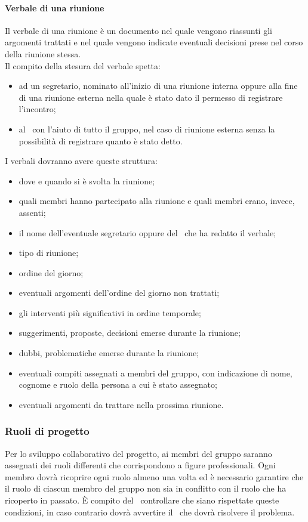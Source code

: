 \documentclass[../NormeProgetto.tex]{subfiles}
\begin{document}
		\paragraph{Verbale di una riunione}
			Il verbale di una riunione è un documento nel quale vengono riassunti gli argomenti trattati e nel quale vengono indicate eventuali decisioni prese nel corso della riunione stessa.\\ Il compito della stesura del verbale spetta:
			\begin{itemize}
				\item ad un segretario, nominato all'inizio di una riunione interna oppure alla fine di una riunione esterna nella quale è stato dato il permesso di registrare l'incontro;
				\item al \responsabilediprogetto\ con l'aiuto di tutto il gruppo, nel caso di riunione esterna senza la possibilità di registrare quanto è stato detto.
			\end{itemize}
			I verbali dovranno avere queste struttura:
			\begin{itemize}
				\item dove e quando si è svolta la riunione;
				\item quali membri hanno partecipato alla riunione e quali membri erano, invece, assenti;
				\item il nome dell'eventuale segretario oppure del \responsabilediprogetto\ che ha redatto il verbale;
				\item tipo di riunione;
				\item ordine del giorno;
				\item eventuali argomenti dell'ordine del giorno non trattati;
				\item gli interventi più significativi in ordine temporale;
				\item suggerimenti, proposte, decisioni emerse durante la riunione;
				\item dubbi, problematiche emerse durante la riunione;
				\item eventuali compiti assegnati a membri del gruppo, con indicazione di nome, cognome e ruolo della persona a cui è stato assegnato;
				\item eventuali argomenti da trattare nella prossima riunione.
			\end{itemize}
	\subsubsection{Ruoli di progetto}
		Per lo sviluppo collaborativo del progetto, ai membri del gruppo saranno assegnati dei ruoli differenti che corrispondono a figure professionali. Ogni membro dovrà ricoprire ogni ruolo almeno una volta ed è necessario garantire che il ruolo di ciascun membro del gruppo non sia in conflitto con il ruolo che ha ricoperto in passato. È compito del \verificatore\ controllare che siano rispettate queste condizioni, in caso contrario dovrà avvertire il \responsabilediprogetto\ che dovrà risolvere il problema.
\end{document}

